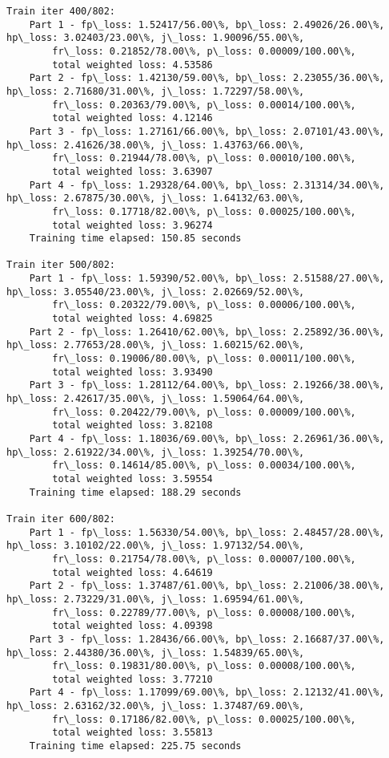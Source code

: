 \documentclass[11pt]{article}
\begin{document}
\begin{Verbatim}[commandchars=\\\{\}]
Train iter 400/802:
	Part 1 - fp\_loss: 1.52417/56.00\%, bp\_loss: 2.49026/26.00\%, hp\_loss: 3.02403/23.00\%, j\_loss: 1.90096/55.00\%, 
		fr\_loss: 0.21852/78.00\%, p\_loss: 0.00009/100.00\%, 
		total weighted loss: 4.53586
	Part 2 - fp\_loss: 1.42130/59.00\%, bp\_loss: 2.23055/36.00\%, hp\_loss: 2.71680/31.00\%, j\_loss: 1.72297/58.00\%, 
		fr\_loss: 0.20363/79.00\%, p\_loss: 0.00014/100.00\%, 
		total weighted loss: 4.12146
	Part 3 - fp\_loss: 1.27161/66.00\%, bp\_loss: 2.07101/43.00\%, hp\_loss: 2.41626/38.00\%, j\_loss: 1.43763/66.00\%, 
		fr\_loss: 0.21944/78.00\%, p\_loss: 0.00010/100.00\%, 
		total weighted loss: 3.63907
	Part 4 - fp\_loss: 1.29328/64.00\%, bp\_loss: 2.31314/34.00\%, hp\_loss: 2.67875/30.00\%, j\_loss: 1.64132/63.00\%, 
		fr\_loss: 0.17718/82.00\%, p\_loss: 0.00025/100.00\%, 
		total weighted loss: 3.96274
	Training time elapsed: 150.85 seconds

Train iter 500/802:
	Part 1 - fp\_loss: 1.59390/52.00\%, bp\_loss: 2.51588/27.00\%, hp\_loss: 3.05540/23.00\%, j\_loss: 2.02669/52.00\%, 
		fr\_loss: 0.20322/79.00\%, p\_loss: 0.00006/100.00\%, 
		total weighted loss: 4.69825
	Part 2 - fp\_loss: 1.26410/62.00\%, bp\_loss: 2.25892/36.00\%, hp\_loss: 2.77653/28.00\%, j\_loss: 1.60215/62.00\%, 
		fr\_loss: 0.19006/80.00\%, p\_loss: 0.00011/100.00\%, 
		total weighted loss: 3.93490
	Part 3 - fp\_loss: 1.28112/64.00\%, bp\_loss: 2.19266/38.00\%, hp\_loss: 2.42617/35.00\%, j\_loss: 1.59064/64.00\%, 
		fr\_loss: 0.20422/79.00\%, p\_loss: 0.00009/100.00\%, 
		total weighted loss: 3.82108
	Part 4 - fp\_loss: 1.18036/69.00\%, bp\_loss: 2.26961/36.00\%, hp\_loss: 2.61922/34.00\%, j\_loss: 1.39254/70.00\%, 
		fr\_loss: 0.14614/85.00\%, p\_loss: 0.00034/100.00\%, 
		total weighted loss: 3.59554
	Training time elapsed: 188.29 seconds

Train iter 600/802:
	Part 1 - fp\_loss: 1.56330/54.00\%, bp\_loss: 2.48457/28.00\%, hp\_loss: 3.10102/22.00\%, j\_loss: 1.97132/54.00\%, 
		fr\_loss: 0.21754/78.00\%, p\_loss: 0.00007/100.00\%, 
		total weighted loss: 4.64619
	Part 2 - fp\_loss: 1.37487/61.00\%, bp\_loss: 2.21006/38.00\%, hp\_loss: 2.73229/31.00\%, j\_loss: 1.69594/61.00\%, 
		fr\_loss: 0.22789/77.00\%, p\_loss: 0.00008/100.00\%, 
		total weighted loss: 4.09398
	Part 3 - fp\_loss: 1.28436/66.00\%, bp\_loss: 2.16687/37.00\%, hp\_loss: 2.44380/36.00\%, j\_loss: 1.54839/65.00\%, 
		fr\_loss: 0.19831/80.00\%, p\_loss: 0.00008/100.00\%, 
		total weighted loss: 3.77210
	Part 4 - fp\_loss: 1.17099/69.00\%, bp\_loss: 2.12132/41.00\%, hp\_loss: 2.63162/32.00\%, j\_loss: 1.37487/69.00\%, 
		fr\_loss: 0.17186/82.00\%, p\_loss: 0.00025/100.00\%, 
		total weighted loss: 3.55813
	Training time elapsed: 225.75 seconds


\end{Verbatim}
\end{document}
